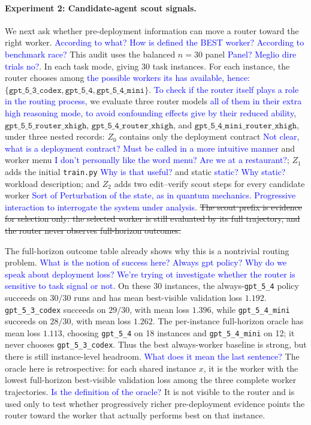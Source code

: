 \documentclass{article}
\begin{document}
\paragraph{Experiment 2: Candidate-agent scout signals.}
We next ask whether pre-deployment information can move a router toward the right worker. \textcolor{blue}{According to what? How is defined the BEST worker? According to benchmark race?}
This audit uses the balanced \(n=30\) panel \textcolor{blue}{Panel? Meglio dire trials no?}. In each task mode, giving 30 task instances.
For each instance, the router chooses among \textcolor{blue}{the possible workers its has available, hence: }\(\{\texttt{gpt\_5\_3\_codex},\texttt{gpt\_5\_4},\texttt{gpt\_5\_4\_mini}\}\).
\textcolor{blue}{To check if the router itself plays a role in the routing process}, we evaluate three router models \textcolor{blue}{all of them in their extra high reasoning mode, to avoid confounding effects give by their reduced ability}, \(\texttt{gpt\_5\_5\_router\_xhigh}\), \(\texttt{gpt\_5\_4\_router\_xhigh}\), and \(\texttt{gpt\_5\_4\_mini\_router\_xhigh}\), under three nested records:
\(Z_0\) contains only the deployment contract \textcolor{blue}{Not clear, what is a deployment contract? Must be called in a more intuitive manner} and worker menu \textcolor{blue}{I don't personally like the word menu? Are we at a restaurant?};
\(Z_1\) adds the initial \texttt{train.py} \textcolor{blue}{Why is that useful? } and static \textcolor{blue}{static? Why static? } workload description;
and \(Z_2\) adds two edit--verify scout steps for every candidate worker \textcolor{blue}{Sort of Perturbation of the state, as in quantum mechanics. Progressive interaction to interrogate the system under analysis}.
\sout{The scout prefix is evidence for selection only: the selected worker is still evaluated by its full trajectory, and the router never observes full-horizon outcomes.}

The full-horizon outcome table already shows why this is a nontrivial routing problem. \textcolor{blue}{What is the notion of success here? Always gpt policy? Why do we speak about deployment loss? We're trying ot investigate whether the router is sensitive to task signal or not.}
On these 30 instances, the always-\texttt{gpt\_5\_4} policy succeeds on \(30/30\) runs and has mean best-visible validation loss \(1.192\).
\texttt{gpt\_5\_3\_codex} succeeds on \(29/30\), with mean loss \(1.396\), while \texttt{gpt\_5\_4\_mini} succeeds on \(28/30\), with mean loss \(1.262\).
The per-instance full-horizon oracle has mean loss \(1.113\), choosing \texttt{gpt\_5\_4} on 18 instances and \texttt{gpt\_5\_4\_mini} on 12; it never chooses \texttt{gpt\_5\_3\_codex}.
Thus the best always-worker baseline is strong, but there is still instance-level headroom. \textcolor{blue}{What does it mean the last sentence?}
The oracle here is retrospective: for each shared instance \(x\), it is the worker with the lowest full-horizon best-visible validation loss among the three complete worker trajectories. \textcolor{blue}{Is the definition of the oracle?}
It is not visible to the router and is used only to test whether progressively richer pre-deployment evidence points the router toward the worker that actually performs best on that instance.
\end{document}
